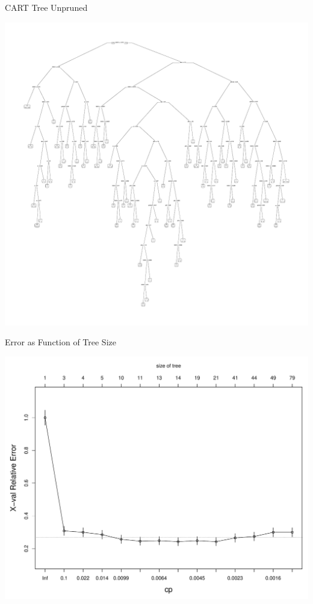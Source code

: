 \documentclass[12pt]{beamer}
\begin{document}
\begin{frame}{CART Tree Unpruned}
  \begin{center}
    \includegraphics[scale=0.5]{figs/rpart_fulltree.pdf}
    \end{center}
\end{frame}


\begin{frame}{Error as Function of Tree Size}
  \begin{center}
    \includegraphics[scale=0.4]{figs/real_data_cp.pdf}
    \end{center}

\end{frame}
\end{document}
